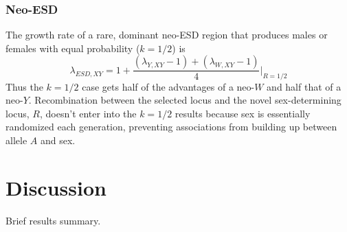 \documentclass[12pt]{article}
\begin{document}
\subsubsection*{Neo-ESD}

The growth rate of a rare, dominant neo-ESD region that produces males or females with equal probability ($k=1/2$) is
\begin{equation}
\lambda_{ESD,XY} = 1 + \frac{(\lambda_{Y,XY} - 1) + (\lambda_{W,XY} -1)}{4} \Big|_{R=1/2}
\end{equation}
Thus the $k=1/2$ case gets half of the advantages of a neo-$W$ and half that of a neo-$Y$.  
Recombination between the selected locus and the novel sex-determining locus, $R$, doesn't enter into the $k=1/2$ results because sex is essentially randomized each generation, %
preventing associations from building up between allele $A$ and sex.  

\linenumbers
\modulolinenumbers[2]

\section*{Discussion}

Brief results summary. 
\end{document}
